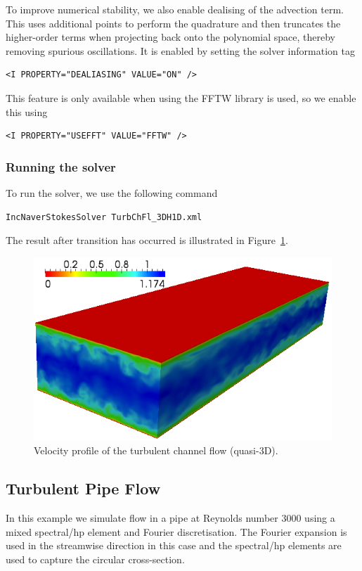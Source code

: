 To improve numerical stability, we also enable dealising of the advection term.
This uses additional points to perform the quadrature and then truncates the
higher-order terms when projecting back onto the polynomial space, thereby
removing spurious oscillations. It is enabled by setting the solver information
tag
\begin{lstlisting}[style=XMLStyle]
<I PROPERTY="DEALIASING" VALUE="ON" />
\end{lstlisting}
This feature is only available when using the FFTW library is used, so we enable
this using
\begin{lstlisting}[style=XMLStyle]
<I PROPERTY="USEFFT" VALUE="FFTW" />
\end{lstlisting}


\subsubsection{Running the solver}
To run the solver, we use the following command
\begin{lstlisting}[style=BashInputStyle]
IncNaverStokesSolver TurbChFl_3DH1D.xml
\end{lstlisting}
The result after transition has occurred is illustrated in
Figure~\ref{f:incns:turbchanflow}.

\begin{figure}
\begin{center}
\includegraphics[width=12cm]{Figures/ChanCont.png}
\caption{Velocity profile of the turbulent channel flow (quasi-3D).}
\label{f:incns:turbchanflow}
\end{center}
\end{figure}


\subsection{Turbulent Pipe Flow}
In this example we simulate flow in a pipe at Reynolds number 3000 using a mixed
spectral/hp element and Fourier discretisation. The Fourier expansion is used in
the streamwise direction in this case and the spectral/hp elements are used to
capture the circular cross-section.

